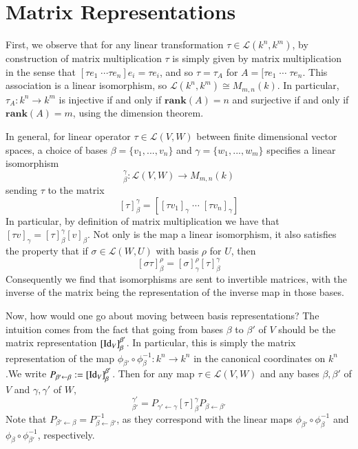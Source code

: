 \section{Matrix Representations}\label{sec:MatrixRep}

First, we observe that for any linear transformation $\tau \in \mathcal{L}(k^n,k^m)$, by construction of matrix multiplication $\tau$ is simply given by matrix multiplication in the sense that $[\tau e_1\;\cdots \tau e_n]e_i = \tau e_i$, and so $\tau = \tau_A$ for $A = [\tau e_1\;\cdots \;\tau e_n$. This association is a linear isomorphism, so $\mathcal{L}(k^n,k^m) \cong M_{m,n}(k)$. In particular, $\tau_A:k^n\rightarrow k^m$ is injective if and only if $\textbf{rank}(A) = n$ and surjective if and only if $\textbf{rank}(A) = m$, using the dimension theorem.

In general, for linear operator $\tau \in \mathcal{L}(V,W)$ between finite dimensional vector spaces, a choice of bases $\beta = \{v_1,...,v_n\}$ and $\gamma = \{w_1,...,w_m\}$ specifies a linear isomorphism \begin{equation*}
    [\cdot]_{\beta}^{\gamma}:\mathcal{L}(V,W)\rightarrow M_{m,n}(k)
\end{equation*}
sending $\tau$ to the matrix $$[\tau]_{\beta}^{\gamma} = \left[[\tau v_1]_{\gamma}\;\cdots\;[\tau v_n]_{\gamma}\right]$$
In particular, by definition of matrix multiplication we have that $[\tau v]_{\gamma} = [\tau]_{\beta}^{\gamma}[v]_{\beta}$. Not only is the map a linear isomorphism, it also satisfies the property that if $\sigma\in\mathcal{L}(W,U)$ with basis $\rho$ for $U$, then $$[\sigma\tau]_{\beta}^{\rho} = [\sigma]_{\gamma}^{\rho}[\tau]_{\beta}^{\gamma}$$
Consequently we find that isomorphisms are sent to invertible matrices, with the inverse of the matrix being the representation of the inverse map in those bases.

Now, how would one go about moving between basis representations? The intuition comes from the fact that going from bases $\beta$ to $\beta'$ of $V$ should be the matrix representation $[\operatorname{Id}_V]_{\beta}^{\beta'}$. In particular, this is simply the matrix representation of the map $\phi_{\beta'}\circ \phi_{\beta}^{-1}:k^n\rightarrow k^n$ in the canonical coordinates on $k^n$.We write $P_{\beta'\leftarrow \beta} := [\operatorname{Id}_V]_{\beta}^{\beta'}$. Then for any map $\tau \in \mathcal{L}(V,W)$ and any bases $\beta,\beta'$ of $V$ and $\gamma,\gamma'$ of $W$, \begin{equation*}
    [\tau]_{\beta'}^{\gamma'} = P_{\gamma'\leftarrow \gamma}[\tau]_{\beta}^{\gamma}P_{\beta\leftarrow \beta'}
\end{equation*}
Note that $P_{\beta'\leftarrow \beta} = P_{\beta\leftarrow \beta'}^{-1}$, as they correspond with the linear maps $\phi_{\beta'}\circ \phi_{\beta}^{-1}$ and $\phi_{\beta}\circ \phi_{\beta'}^{-1}$, respectively.



